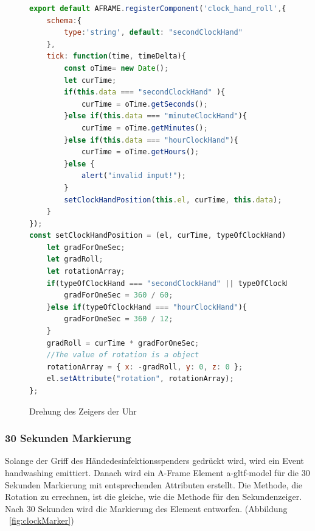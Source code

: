 \begin{figure}[ht]
\vspace*{1em}
\centering
\caption[Drehung des Zeigers der Uhr]{Drehung des Zeigers der Uhr}
\begin{lstlisting}[language=JavaScript, style=htmlcssjs]
export default AFRAME.registerComponent('clock_hand_roll',{
    schema:{
        type:'string', default: "secondClockHand"
    },
    tick: function(time, timeDelta){
        const oTime= new Date();
        let curTime;
        if(this.data === "secondClockHand" ){
            curTime = oTime.getSeconds();
        }else if(this.data === "minuteClockHand"){
            curTime = oTime.getMinutes();
        }else if(this.data === "hourClockHand"){
            curTime = oTime.getHours();
        }else {
            alert("invalid input!");
        }
        setClockHandPosition(this.el, curTime, this.data);
    }
});
const setClockHandPosition = (el, curTime, typeOfClockHand) => {
    let gradForOneSec;
    let gradRoll;
    let rotationArray;
    if(typeOfClockHand === "secondClockHand" || typeOfClockHand === "minuteClockHand"){
        gradForOneSec = 360 / 60;
    }else if(typeOfClockHand === "hourClockHand"){
        gradForOneSec = 360 / 12;
    }
    gradRoll = curTime * gradForOneSec;
    //The value of rotation is a object
    rotationArray = { x: -gradRoll, y: 0, z: 0 };
    el.setAttribute("rotation", rotationArray);
};
\end{lstlisting}
\label{fig:clockRoll} 
\end{figure}
 
 \subsubsection{30 Sekunden Markierung}
 Solange der Griff des Händedesinfektionsspenders gedrückt wird, wird ein Event {\selectfont  handwashing} emittiert. Danach wird ein A-Frame Element {\selectfont  a-gltf-model} für die 30 Sekunden Markierung mit entsprechenden Attributen erstellt. Die Methode, die Rotation zu errechnen, ist die gleiche, wie die Methode für den Sekundenzeiger. Nach 30 Sekunden wird die Markierung des Element entworfen. (Abbildung ~\ref{fig:clockMarker})
 
